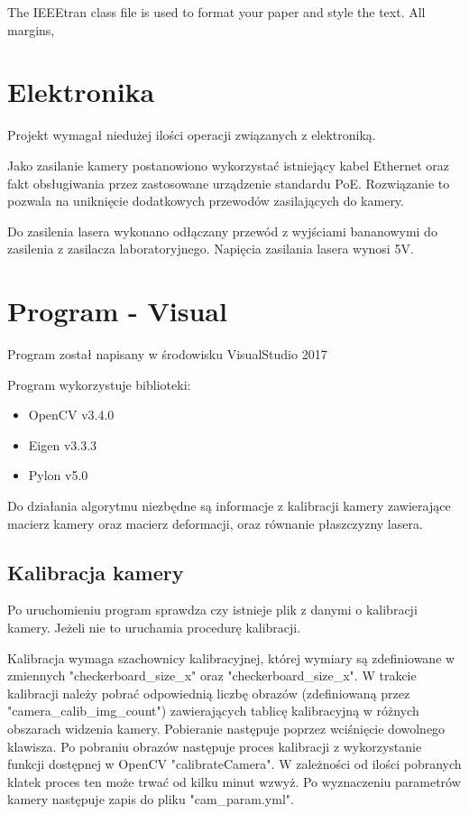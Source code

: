 \documentclass[conference]{IEEEtran}
\begin{document}
The IEEEtran class file is used to format your paper and style the text. All margins, 

\section{Elektronika}
Projekt wymagał niedużej ilości operacji związanych z elektroniką.

Jako zasilanie kamery postanowiono wykorzystać istniejący kabel Ethernet oraz fakt obsługiwania przez zastosowane urządzenie standardu PoE. Rozwiązanie to pozwala na uniknięcie dodatkowych przewodów zasilających do kamery.

Do zasilenia lasera wykonano odłączany przewód z wyjściami bananowymi do zasilenia z zasilacza laboratoryjnego. Napięcia zasilania lasera wynosi 5V.

\section{Program - Visual}

Program został napisany w środowisku VisualStudio 2017

Program wykorzystuje biblioteki:
\begin{itemize}
\item OpenCV v3.4.0
\item Eigen v3.3.3
\item Pylon v5.0
\end{itemize}

Do działania algorytmu niezbędne są informacje z kalibracji kamery zawierające macierz kamery oraz macierz deformacji, oraz równanie płaszczyzny lasera.

\subsection{Kalibracja kamery}

Po uruchomieniu program sprawdza czy istnieje plik z danymi o kalibracji kamery. Jeżeli nie to uruchamia procedurę kalibracji. 

Kalibracja wymaga szachownicy kalibracyjnej, której wymiary są zdefiniowane w zmiennych "checkerboard_size_x" oraz "checkerboard_size_x". W trakcie kalibracji należy pobrać odpowiednią liczbę obrazów (zdefiniowaną przez "camera_calib_img_count") zawierających tablicę kalibracyjną w różnych obszarach widzenia kamery. Pobieranie następuje poprzez wciśnięcie dowolnego klawisza. Po pobraniu obrazów następuje proces kalibracji z wykorzystanie funkcji dostępnej w OpenCV "calibrateCamera". W zależności od ilości pobranych klatek proces ten może trwać od kilku minut wzwyż. Po wyznaczeniu parametrów kamery następuje zapis do pliku "cam_param.yml".
\end{document}
